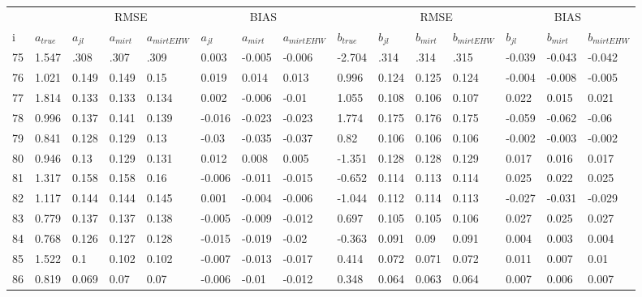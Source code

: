 \begin{table}
	\renewcommand{\arraystretch}{1}%
	\footnotesize
	\centering \begin{tabular}{|l|l|lll|lll|l|lll|lll}
		& &  \multicolumn{3}{c}{RMSE}& \multicolumn{3}{c}{BIAS}& & \multicolumn{3}{c}{RMSE}& \multicolumn{3}{c}{BIAS} \\
		i & $a_{true}$ & $a_{jl}$ & $a_{mirt}$ & $a_{mirt EHW}$ & $ a_{jl} $ & $ a_{mirt} $ & $ a_{mirt EHW} $ & $ b_{true} $ & $ b_{jl} $ & $ b_{mirt} $ & $ b_{mirt EHW} $ & $ b_{jl} $ & $b_{mirt}$ & $b_{mirt EHW}$\\
		\hline
		75 & 1.547 & .308 & .307 & .309 & 0.003 & -0.005 & -0.006 & -2.704 & .314 & .314 & .315 & -0.039 & -0.043 & -0.042 \\
		76 & 1.021 & 0.149 & 0.149 & 0.15 & 0.019 & 0.014 & 0.013 & 0.996 & 0.124 & 0.125 & 0.124 & -0.004 & -0.008 & -0.005 \\
		77 & 1.814 & 0.133 & 0.133 & 0.134 & 0.002 & -0.006 & -0.01 & 1.055 & 0.108 & 0.106 & 0.107 & 0.022 & 0.015 & 0.021 \\
		78 & 0.996 & 0.137 & 0.141 & 0.139 & -0.016 & -0.023 & -0.023 & 1.774 & 0.175 & 0.176 & 0.175 & -0.059 & -0.062 & -0.06 \\
		79 & 0.841 & 0.128 & 0.129 & 0.13 & -0.03 & -0.035 & -0.037 & 0.82 & 0.106 & 0.106 & 0.106 & -0.002 & -0.003 & -0.002 \\
		80 & 0.946 & 0.13 & 0.129 & 0.131 & 0.012 & 0.008 & 0.005 & -1.351 & 0.128 & 0.128 & 0.129 & 0.017 & 0.016 & 0.017 \\
		81 & 1.317 & 0.158 & 0.158 & 0.16 & -0.006 & -0.011 & -0.015 & -0.652 & 0.114 & 0.113 & 0.114 & 0.025 & 0.022 & 0.025 \\
		82 & 1.117 & 0.144 & 0.144 & 0.145 & 0.001 & -0.004 & -0.006 & -1.044 & 0.112 & 0.114 & 0.113 & -0.027 & -0.031 & -0.029 \\
		83 & 0.779 & 0.137 & 0.137 & 0.138 & -0.005 & -0.009 & -0.012 & 0.697 & 0.105 & 0.105 & 0.106 & 0.027 & 0.025 & 0.027 \\
		84 & 0.768 & 0.126 & 0.127 & 0.128 & -0.015 & -0.019 & -0.02 & -0.363 & 0.091 & 0.09 & 0.091 & 0.004 & 0.003 & 0.004 \\
		85 & 1.522 & 0.1 & 0.102 & 0.102 & -0.007 & -0.013 & -0.017 & 0.414 & 0.072 & 0.071 & 0.072 & 0.011 & 0.007 & 0.01 \\
		86 & 0.819 & 0.069 & 0.07 & 0.07 & -0.006 & -0.01 & -0.012 & 0.348 & 0.064 & 0.063 & 0.064 & 0.007 & 0.006 & 0.007 \\

\end{tabular}
\end{table}
